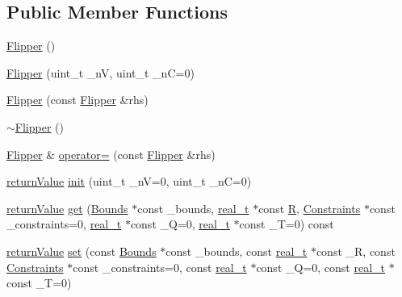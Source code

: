 \subsection*{Public Member Functions}
\begin{DoxyCompactItemize}
\item 
\hyperlink{class_flipper_a375f713a471ba59c77da0d5bce22ccbf}{Flipper} ()
\item 
\hyperlink{class_flipper_ab92d2eee560f2f55631a6af9e0175bbf}{Flipper} (uint\+\_\+t \+\_\+nV, uint\+\_\+t \+\_\+nC=0)
\item 
\hyperlink{class_flipper_a710eaed6aa38f0206f0a57331ce0f28d}{Flipper} (const \hyperlink{class_flipper}{Flipper} \&rhs)
\item 
\hyperlink{class_flipper_ae498ab519584627d366565705b5655e3}{$\sim$\+Flipper} ()
\item 
\hyperlink{class_flipper}{Flipper} \& \hyperlink{class_flipper_ad1f1f6c3ae1e54a43eb70c9c2d7bb023}{operator=} (const \hyperlink{class_flipper}{Flipper} \&rhs)
\item 
\hyperlink{_message_handling_8hpp_a81d556f613bfbabd0b1f9488c0fa865e}{return\+Value} \hyperlink{class_flipper_abca0d4bbaa4e51f4e005f891c1718c0f}{init} (uint\+\_\+t \+\_\+nV=0, uint\+\_\+t \+\_\+nC=0)
\item 
\hyperlink{_message_handling_8hpp_a81d556f613bfbabd0b1f9488c0fa865e}{return\+Value} \hyperlink{class_flipper_aba5d377c7d818ede730d7990da62046e}{get} (\hyperlink{class_bounds}{Bounds} $\ast$const \+\_\+bounds, \hyperlink{qp_o_a_s_e_s__wrapper_8h_a0d00e2b3dfadee81331bbb39068570c4}{real\+\_\+t} $\ast$const \hyperlink{class_flipper_a8d49f4f458ba1b15de596695cd50d5aa}{R}, \hyperlink{class_constraints}{Constraints} $\ast$const \+\_\+constraints=0, \hyperlink{qp_o_a_s_e_s__wrapper_8h_a0d00e2b3dfadee81331bbb39068570c4}{real\+\_\+t} $\ast$const \+\_\+Q=0, \hyperlink{qp_o_a_s_e_s__wrapper_8h_a0d00e2b3dfadee81331bbb39068570c4}{real\+\_\+t} $\ast$const \+\_\+T=0) const
\item 
\hyperlink{_message_handling_8hpp_a81d556f613bfbabd0b1f9488c0fa865e}{return\+Value} \hyperlink{class_flipper_a51f18dc856dfbf43447faf263182e8c2}{set} (const \hyperlink{class_bounds}{Bounds} $\ast$const \+\_\+bounds, const \hyperlink{qp_o_a_s_e_s__wrapper_8h_a0d00e2b3dfadee81331bbb39068570c4}{real\+\_\+t} $\ast$const \+\_\+R, const \hyperlink{class_constraints}{Constraints} $\ast$const \+\_\+constraints=0, const \hyperlink{qp_o_a_s_e_s__wrapper_8h_a0d00e2b3dfadee81331bbb39068570c4}{real\+\_\+t} $\ast$const \+\_\+Q=0, const \hyperlink{qp_o_a_s_e_s__wrapper_8h_a0d00e2b3dfadee81331bbb39068570c4}{real\+\_\+t} $\ast$const \+\_\+T=0)
\end{DoxyCompactItemize}
